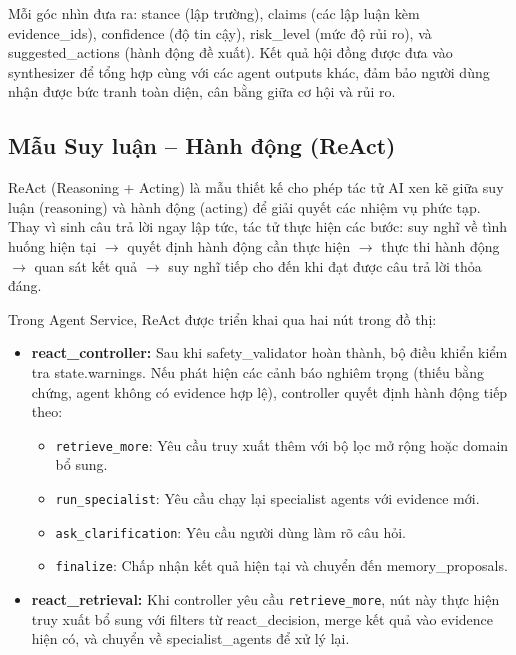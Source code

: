 Mỗi góc nhìn đưa ra: stance (lập trường), claims (các lập luận kèm evidence\_ids), confidence (độ tin cậy), risk\_level (mức độ rủi ro), và suggested\_actions (hành động đề xuất). Kết quả hội đồng được đưa vào synthesizer để tổng hợp cùng với các agent outputs khác, đảm bảo người dùng nhận được bức tranh toàn diện, cân bằng giữa cơ hội và rủi ro.

\subsection{Mẫu Suy luận -- Hành động (ReAct)}

ReAct (Reasoning + Acting) là mẫu thiết kế cho phép tác tử AI xen kẽ giữa suy luận (reasoning) và hành động (acting) để giải quyết các nhiệm vụ phức tạp. Thay vì sinh câu trả lời ngay lập tức, tác tử thực hiện các bước: suy nghĩ về tình huống hiện tại $\rightarrow$ quyết định hành động cần thực hiện $\rightarrow$ thực thi hành động $\rightarrow$ quan sát kết quả $\rightarrow$ suy nghĩ tiếp cho đến khi đạt được câu trả lời thỏa đáng.

Trong Agent Service, ReAct được triển khai qua hai nút trong đồ thị:

\begin{itemize}
    \item \textbf{react\_controller:} Sau khi safety\_validator hoàn thành, bộ điều khiển kiểm tra state.warnings. Nếu phát hiện các cảnh báo nghiêm trọng (thiếu bằng chứng, agent không có evidence hợp lệ), controller quyết định hành động tiếp theo:
    \begin{itemize}
        \item \texttt{retrieve\_more}: Yêu cầu truy xuất thêm với bộ lọc mở rộng hoặc domain bổ sung.
        \item \texttt{run\_specialist}: Yêu cầu chạy lại specialist agents với evidence mới.
        \item \texttt{ask\_clarification}: Yêu cầu người dùng làm rõ câu hỏi.
        \item \texttt{finalize}: Chấp nhận kết quả hiện tại và chuyển đến memory\_proposals.
    \end{itemize}

    \item \textbf{react\_retrieval:} Khi controller yêu cầu \texttt{retrieve\_more}, nút này thực hiện truy xuất bổ sung với filters từ react\_decision, merge kết quả vào evidence hiện có, và chuyển về specialist\_agents để xử lý lại.
\end{itemize}

